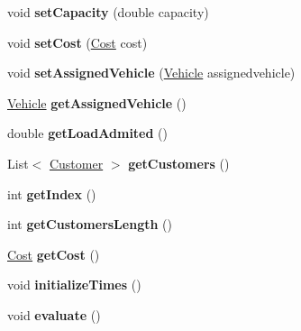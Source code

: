 \begin{DoxyCompactItemize}
\item 
void {\bfseries set\+Capacity} (double capacity)\hypertarget{classsvrptw_1_1_route_a496601d6917dca81d79848b2e585f60f}{}\label{classsvrptw_1_1_route_a496601d6917dca81d79848b2e585f60f}

\item 
void {\bfseries set\+Cost} (\hyperlink{classsvrptw_1_1_cost}{Cost} cost)\hypertarget{classsvrptw_1_1_route_a10b3fb2cb1c615b607816f75500ac058}{}\label{classsvrptw_1_1_route_a10b3fb2cb1c615b607816f75500ac058}

\item 
void {\bfseries set\+Assigned\+Vehicle} (\hyperlink{classsvrptw_1_1_vehicle}{Vehicle} assignedvehicle)\hypertarget{classsvrptw_1_1_route_a82e20a0266ac635095570b5fb846a5e0}{}\label{classsvrptw_1_1_route_a82e20a0266ac635095570b5fb846a5e0}

\item 
\hyperlink{classsvrptw_1_1_vehicle}{Vehicle} {\bfseries get\+Assigned\+Vehicle} ()\hypertarget{classsvrptw_1_1_route_ac6c92b8325fdea2d6a86c72335357c4d}{}\label{classsvrptw_1_1_route_ac6c92b8325fdea2d6a86c72335357c4d}

\item 
double {\bfseries get\+Load\+Admited} ()\hypertarget{classsvrptw_1_1_route_a7ce155d318fc7635a8cea7a169c346bd}{}\label{classsvrptw_1_1_route_a7ce155d318fc7635a8cea7a169c346bd}

\item 
List$<$ \hyperlink{classsvrptw_1_1_customer}{Customer} $>$ {\bfseries get\+Customers} ()\hypertarget{classsvrptw_1_1_route_a733a76e6a33bdc85b818d4b643734bc9}{}\label{classsvrptw_1_1_route_a733a76e6a33bdc85b818d4b643734bc9}

\item 
int {\bfseries get\+Index} ()\hypertarget{classsvrptw_1_1_route_acdc89ab2142faf7a5d01ca67e46486f5}{}\label{classsvrptw_1_1_route_acdc89ab2142faf7a5d01ca67e46486f5}

\item 
int {\bfseries get\+Customers\+Length} ()\hypertarget{classsvrptw_1_1_route_a4f3f10c72d2a55995e7bfebf0f2ea418}{}\label{classsvrptw_1_1_route_a4f3f10c72d2a55995e7bfebf0f2ea418}

\item 
\hyperlink{classsvrptw_1_1_cost}{Cost} {\bfseries get\+Cost} ()\hypertarget{classsvrptw_1_1_route_af17781cb7e5a234e7158a0c054215f75}{}\label{classsvrptw_1_1_route_af17781cb7e5a234e7158a0c054215f75}

\item 
void {\bfseries initialize\+Times} ()\hypertarget{classsvrptw_1_1_route_a08a22df1a9ea9bdfec43d4cc411ec2e1}{}\label{classsvrptw_1_1_route_a08a22df1a9ea9bdfec43d4cc411ec2e1}

\item 
void {\bfseries evaluate} ()\hypertarget{classsvrptw_1_1_route_a26266287211f37d6b8f3d9f8930634a5}{}\label{classsvrptw_1_1_route_a26266287211f37d6b8f3d9f8930634a5}

\end{DoxyCompactItemize}


